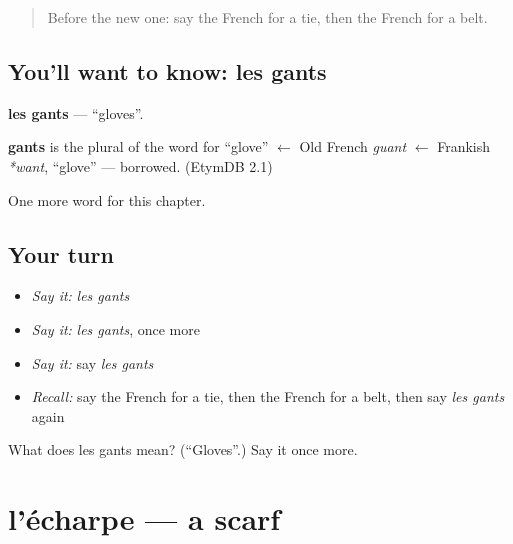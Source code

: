 \label{lesson:FR-C116-gants}



\begin{quote}
Before the new one: say the French for a tie, then the French for a belt.
\end{quote}

\subsection*{You'll want to know: les gants}
\textbf{les gants} — \textquotedblleft{}gloves\textquotedblright{}.

\begin{cousinweb}
\textbf{gants} is the plural of the word for \textquotedblleft{}glove\textquotedblright{} $\leftarrow$ Old French \emph{guant} $\leftarrow$ Frankish \emph{*want}, \textquotedblleft{}glove\textquotedblright{} — borrowed. (EtymDB 2.1)
\end{cousinweb}

\begin{grammarlens}[title={What you've built}]
One more word for this chapter.
\end{grammarlens}

\subsection*{Your turn}
\begin{itemize}
\raggedright
  \item \emph{Say it:} \emph{les gants}
  \item \emph{Say it:} \emph{les gants}, once more
  \item \emph{Say it:} say \emph{les gants}
  \item \emph{Recall:} say the French for a tie, then the French for a belt, then say \emph{les gants} again
\end{itemize}

\begin{tcolorbox}[breakable,colback=teal!4,colframe=teal!35!black,title={Before you move on}]
What does les gants mean? (\textquotedblleft{}Gloves\textquotedblright{}.) Say it once more.
\end{tcolorbox}
\section[l'écharpe]{l'écharpe — a scarf}

\label{lesson:FR-C116-echarpe}



